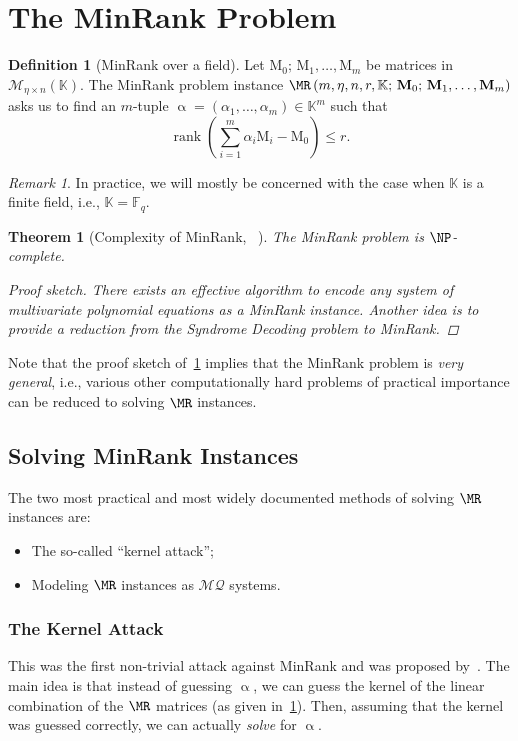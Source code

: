 \documentclass{article}
\DeclareMathOperator{\rank}{rank}
\theoremstyle{remark}
\newtheorem*{remark}{Remark}
\theoremstyle{definition}
\newtheorem{definition}{Definition}
\theoremstyle{plain}
\newtheorem{theorem}{Theorem}
\renewcommand*{\vec}[1]{\bm{\mathrm{#1}}}
\newcommand{\matr}[1]{\bm{\mathrm{#1}}}
\newcommand{\MQ}{\ensuremath{\mathcal{MQ}}}
\begin{document}
\section{The MinRank Problem}\label{sec:mr}
\begin{definition}[MinRank over a field]\label{def:mr}
  Let $\matr{M}_0;\, \matr{M}_1, \ldots, \matr{M}_m$ be matrices in
  $\mathcal{M}_{\eta \times n}(\mathbb{K})$.  The MinRank problem instance
  $\MR\left(m, \eta, n, r, \mathbb{K};\, \matr{M}_0;\, \matr{M}_1, \ldots,
    \matr{M}_m\right)$ asks us to find an $m$-tuple
  $\vec{\upalpha} = (\alpha_1, \ldots, \alpha_m) \in \mathbb{K}^m$ such that
$$
\rank\left(\sum\limits_{i = 1}^{m} \alpha_i \matr{M}_i - \matr{M}_0\right) \le
r\text{.}
$$
\end{definition}
\begin{remark}
  In practice, we will mostly be concerned with the case when $\mathbb{K}$ is a
  finite field, i.e., $\mathbb{K} = \mathbb{F}_q$.
\end{remark}
\begin{theorem}[Complexity of MinRank,
  ~\autocite{BFS99,Cou01}]\label{thm:mr-comp}
  The MinRank problem is $\NP$-complete.
  \begin{proof}[Proof sketch]
    There exists an effective algorithm to encode \emph{any} system of
    multivariate polynomial equations as a MinRank instance.  Another idea is to
    provide a reduction from the Syndrome Decoding problem to MinRank.
  \end{proof}
\end{theorem}

Note that the proof sketch of~\cref{thm:mr-comp} implies that the MinRank
problem is \emph{very general}, i.e., various other computationally hard
problems of practical importance can be reduced to solving $\MR$ instances.

\subsection{Solving MinRank Instances}
The two most practical and most widely documented methods of solving $\MR$
instances are:
\begin{itemize}[noitemsep]
\item The so-called ``kernel attack'';
\item Modeling $\MR$ instances as \MQ{} systems.
\end{itemize}

\subsubsection{The Kernel Attack}\label{sec:kern-attk}
This was the first non-trivial attack against MinRank and was proposed
by~\textcite{GC00}.  The main idea is that instead of guessing $\vec{\upalpha}$,
we can guess the kernel of the linear combination of the $\MR$ matrices (as
given in~\cref{def:mr}).  Then, assuming that the kernel was guessed correctly,
we can actually \emph{solve} for $\vec{\upalpha}$.
\end{document}
